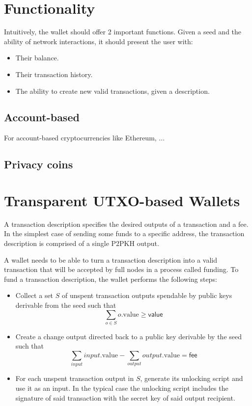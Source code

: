 \documentclass[sigconf]{acmart}
\begin{document}
\section{Functionality}
Intuitively, the wallet should offer 2 important functions. Given a seed and the ability of network interactions, it should present the user with:

\begin{itemize}
    \item Their balance.
    \item Their transaction history.
    \item The ability to create new valid transactions, given a description.
\end{itemize}

\subsection{Account-based}
For account-based cryptocurrencies like Ethereum, ...

\subsection{Privacy coins}

\section{Transparent UTXO-based Wallets}

A transaction description specifies the desired outputs of a transaction and a fee. In the simplest case of sending some funds to a specific address, the transaction description is comprised of a single P2PKH output.

A wallet needs to be able to turn a transaction description into a valid transaction that will be accepted by full nodes in a process called funding. To fund a transaction description, the wallet performs the following steps:

\begin{itemize}
    \item Collect a set $S$ of unspent transaction outputs spendable by public keys derivable from the seed such that $$\sum_{o \in S} o.\text{value} \ge \textsf{value}$$
    \item Create a change output directed back to a public key derivable by the seed such that
    $$\sum_{input} input.\text{value} - \sum_{output} output.\text{value} = \textsf{fee}$$
    \item For each unspent transaction output in $S$, generate its unlocking script and use it as an input. In the typical case the unlocking script includes the signature of said transaction with the secret key of said output recipient.
\end{itemize}
\end{document}
